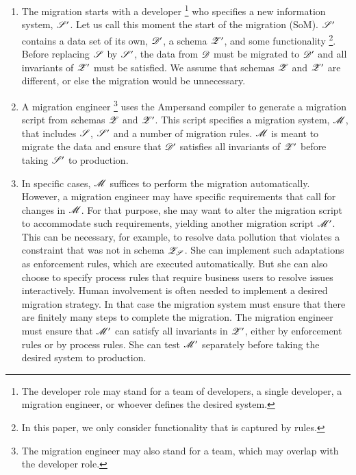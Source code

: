 \documentclass{elsarticle}
\begin{document}
\begin{enumerate}
\item The migration starts with a developer%
\footnote{The developer role may stand for a team of developers, a single developer, a migration engineer, or whoever defines the desired system.}
      who specifies a new information system, $\mathscr{S}'$.
      Let us call this moment the start of the migration (SoM).
      $\mathscr{S}'$ contains a data set of its own, $\mathscr{D}'$, a schema $\mathscr{Z}'$, and some functionality%
\footnote{In this paper, we only consider functionality that is captured by rules.}.
      Before replacing $\mathscr{S}$ by $\mathscr{S}'$, the data from $\mathscr{D}$ must be migrated to $\mathscr{D}'$
      and all invariants of $\mathscr{Z}'$ must be satisfied.
      We assume that schemas $\mathscr{Z}$ and $\mathscr{Z}'$ are different, or else the migration would be unnecessary.
\item A migration engineer%
\footnote{The migration engineer may also stand for a team, which may overlap with the developer role.}
      uses the Ampersand compiler to generate a migration script from schemas $\mathscr{Z}$ and $\mathscr{Z}'$.
      This script specifies a migration system, $\mathscr{M}$, that includes $\mathscr{S}$, $\mathscr{S}'$ and a number of migration rules.
      $\mathscr{M}$ is meant to migrate the data and ensure that $\mathscr{D}'$ satisfies all invariants of $\mathscr{Z}'$
      before taking $\mathscr{S}'$ to production.
\item\label{item3}
      In specific cases, $\mathscr{M}$ suffices to perform the migration automatically.
      However, a migration engineer may have specific requirements that call for changes in $\mathscr{M}$.
      For that purpose, she may want to alter the migration script to accommodate such requirements, yielding another migration script $\mathscr{M}'$.
      This can be necessary, for example, to resolve data pollution that violates a constraint that was not in schema $\mathscr{Z}_{\mathscr{S}}$.
      She can implement such adaptations as enforcement rules, which are executed automatically.
      But she can also choose to specify process rules that require business users to resolve issues interactively.
      Human involvement is often needed to implement a desired migration strategy.
      In that case the migration system must ensure that there are finitely many steps to complete the migration.
      The migration engineer must ensure that $\mathscr{M}'$ can satisfy all invariants in $\mathscr{Z}'$, either by enforcement rules or by process rules.
      She can test $\mathscr{M}'$ separately before taking the desired system to production.

\end{enumerate}
\end{document}
